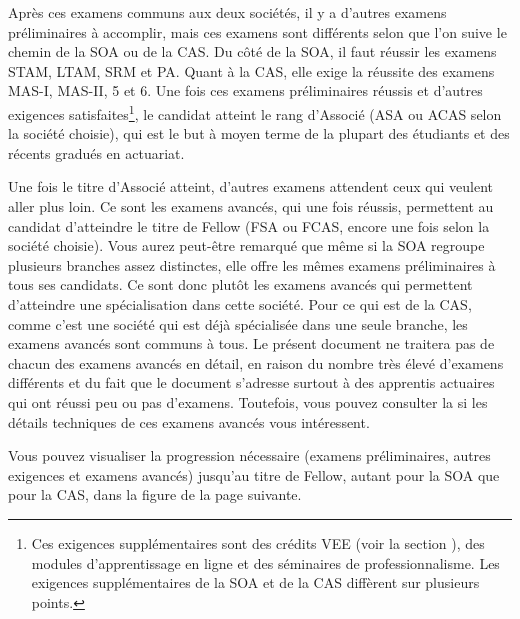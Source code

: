 Après ces examens communs aux deux sociétés, il y a d'autres examens préliminaires à accomplir, mais ces examens sont différents selon que l'on suive le chemin de la SOA ou de la CAS. Du côté de la SOA, il faut réussir les examens STAM, LTAM, SRM et PA. Quant à la CAS, elle exige la réussite des examens MAS-I, MAS-II, 5 et 6. Une fois ces examens préliminaires réussis et d'autres exigences satisfaites\footnote{Ces exigences supplémentaires sont des crédits VEE (voir la section ), des modules d'apprentissage en ligne et des séminaires de professionnalisme. Les exigences supplémentaires de la SOA et de la CAS diffèrent sur plusieurs points.}, le candidat atteint le rang d'Associé (ASA ou ACAS selon la société choisie), qui est le but à moyen terme de la plupart des étudiants et des récents gradués en actuariat. \vspace{\baselineskip}

Une fois le titre d'Associé atteint, d'autres examens attendent ceux qui veulent aller plus loin. Ce sont les examens avancés, qui une fois réussis, permettent au candidat d'atteindre le titre de Fellow (FSA ou FCAS, encore une fois selon la société choisie). Vous aurez peut-être remarqué que même si la SOA regroupe plusieurs branches assez distinctes, elle offre les mêmes examens préliminaires à tous ses candidats. Ce sont donc plutôt les examens avancés qui permettent d'atteindre une spécialisation dans cette société. Pour ce qui est de la CAS, comme c'est une société qui est déjà spécialisée dans une seule branche, les examens avancés sont communs à tous. Le présent document ne traitera pas de chacun des examens avancés en détail, en raison du nombre très élevé d'examens différents et du fait que le document s'adresse surtout à des apprentis actuaires qui ont réussi peu ou pas d'examens. Toutefois, vous pouvez consulter la  si les détails techniques de ces examens avancés vous intéressent. \vspace{\baselineskip}

Vous pouvez visualiser la progression nécessaire (examens préliminaires, autres exigences et examens avancés) jusqu'au titre de Fellow, autant pour la SOA que pour la CAS, dans la figure de la page suivante. \newpage

